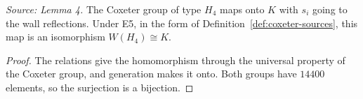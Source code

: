 \begin{theorem}
  \label{thm:coxeter-presentation}
  \leanok
  \textit{Source: Lemma 4.}
  The Coxeter group of type \(H_4\) maps onto \(K\) with \(s_i\) going to
  the wall reflections. Under E5, in the form of
  Definition~\ref{def:coxeter-sources}, this map is an isomorphism
  \(W(H_4)\cong K\).
\end{theorem}
\begin{proof}
  \leanok
  The relations give the homomorphism through the universal property of
  the Coxeter group, and generation makes it onto. Both groups have
  \(14400\) elements, so the surjection is a bijection.
\end{proof}
